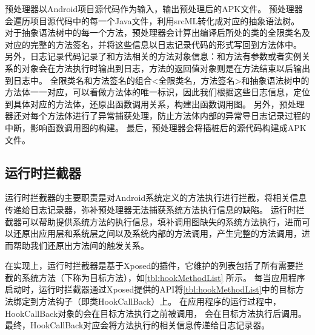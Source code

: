预处理器以Android项目源代码作为输入，输出预处理后的APK文件。
预处理器会遍历项目源代码中的每一个Java文件，利用srcML转化成对应的抽象语法树。
对于抽象语法树中的每一个方法，预处理器会计算出编译后所处的类的全限类名及对应的完整的方法签名，并将这些信息以日志记录代码的形式写回到方法体中。
另外，日志记录代码记录了和方法相关的方法对象信息：和方法有参数或者实例关系的对象会在方法执行时输出到日志，方法的返回值对象则是在方法结束以后输出到日志中。
全限类名和方法签名的组合<全限类名，方法签名>和抽象语法树中的方法体一一对应，可以看做方法体的唯一标识，因此我们根据这些日志信息，定位到具体对应的方法体，还原出函数调用关系，构建出函数调用图。
另外，预处理器还对每个方法体进行了异常捕获处理，防止方法体内部的异常导日志记录过程的中断，影响函数调用图的构建。
最后，预处理器会将插桩后的源代码构建成APK文件。


\subsection{运行时拦截器}
运行时拦截器的主要职责是对Android系统定义的方法执行进行拦截，将相关信息传递给日志记录器，弥补预处理器无法捕获系统方法执行信息的缺陷。
运行时拦截器可以帮助提供系统方法的执行信息，填补调用图缺失的系统方法执行，进而可以还原出应用层和系统层之间以及系统内部的方法调用，产生完整的方法调用，进而帮助我们还原出方法间的触发关系。

在实现上，运行时拦截器是基于Xposed的插件，它维护的列表包括了所有需要拦截的系统方法（下称为目标方法），如\autoref{tbl:hookMethodList} 所示。
每当应用程序启动时，运行时拦截器通过Xposed提供的API将\autoref{tbl:hookMethodList}中的目标方法绑定到方法钩子（即类HookCallBack）上。
在应用程序的运行过程中，HookCallBack对象的会在目标方法执行之前被调用，
会在目标方法执行后调用。
最终，HookCallBack对应会将方法执行的相关信息传递给日志记录器。




